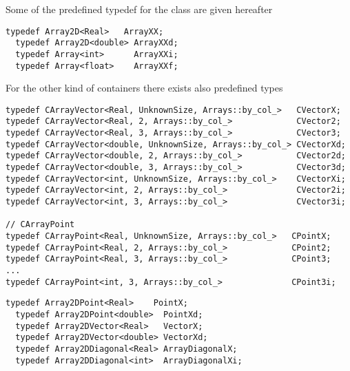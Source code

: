 \documentclass[a4paper,10pt]{article}
\begin{document}
Some of the predefined typedef for the  class are given
hereafter
\begin{lstlisting}[style=customcpp,caption=Array2D family]
  typedef Array2D<Real>   ArrayXX;
  typedef Array2D<double> ArrayXXd;
  typedef Array<int>      ArrayXXi;
  typedef Array<float>    ArrayXXf;
\end{lstlisting}

For the other kind of containers there exists also predefined types

\begin{lstlisting}[style=customcpp,caption=CArrayVector and CArrayPoint family]
typedef CArrayVector<Real, UnknownSize, Arrays::by_col_>   CVectorX;
typedef CArrayVector<Real, 2, Arrays::by_col_>             CVector2;
typedef CArrayVector<Real, 3, Arrays::by_col_>             CVector3;
typedef CArrayVector<double, UnknownSize, Arrays::by_col_> CVectorXd;
typedef CArrayVector<double, 2, Arrays::by_col_>           CVector2d;
typedef CArrayVector<double, 3, Arrays::by_col_>           CVector3d;
typedef CArrayVector<int, UnknownSize, Arrays::by_col_>    CVectorXi;
typedef CArrayVector<int, 2, Arrays::by_col_>              CVector2i;
typedef CArrayVector<int, 3, Arrays::by_col_>              CVector3i;

// CArrayPoint
typedef CArrayPoint<Real, UnknownSize, Arrays::by_col_>   CPointX;
typedef CArrayPoint<Real, 2, Arrays::by_col_>             CPoint2;
typedef CArrayPoint<Real, 3, Arrays::by_col_>             CPoint3;
...
typedef CArrayPoint<int, 3, Arrays::by_col_>              CPoint3i;
\end{lstlisting}

\begin{lstlisting}[style=customcpp,caption=Array2DVector\, Array2DPoint and Array2DDiagonal]
  typedef Array2DPoint<Real>    PointX;
  typedef Array2DPoint<double>  PointXd;
  typedef Array2DVector<Real>   VectorX;
  typedef Array2DVector<double> VectorXd;
  typedef Array2DDiagonal<Real> ArrayDiagonalX;
  typedef Array2DDiagonal<int>  ArrayDiagonalXi;
\end{lstlisting}

%
%
\end{document}
